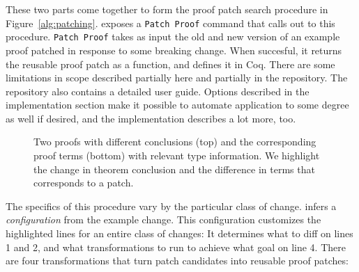 These two parts come together to form the proof patch search procedure in Figure~\ref{alg:patching}.
\sysname exposes a \lstinline{Patch Proof} command that calls out to this procedure.
\lstinline{Patch Proof} takes as input the old and new version of an example proof patched in response to some breaking change.
When succesful, it returns the reusable proof patch as a function, and defines it in Coq.
There are some limitations in scope described partially here and partially in the repository.
The \sysname repository also contains a detailed user guide.
Options described in the implementation section make it possible to automate application to some degree as well if desired,
and the implementation describes a lot more, too.


\begin{figure*}
\begin{minipage}{0.50\textwidth}
\lstset{language=coq, aboveskip=0pt, belowskip=0pt}






\end{minipage}
\hfill
\begin{minipage}{0.48\textwidth}
\lstset{language=coq, aboveskip=0pt, belowskip=0pt}






\end{minipage}
\caption{Two proofs with different conclusions (top) and the
corresponding proof terms (bottom) with relevant type information. We highlight the change in theorem conclusion and
the difference in terms that corresponds to a patch.}
\label{fig:example}
\end{figure*}

The specifics of this procedure vary by the particular class of change.
\sysname infers a \textit{configuration} from the example change.
This configuration customizes the highlighted lines for an entire class of changes:
It determines what to diff on lines 1 and 2,
and what transformations to run to achieve what goal on line 4.
There are four transformations that turn patch candidates into reusable proof patches:

